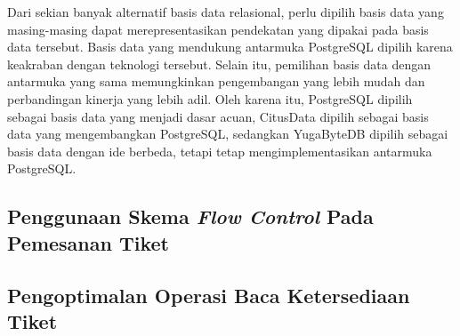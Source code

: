 Dari sekian banyak alternatif basis data relasional, perlu dipilih basis data yang masing-masing dapat merepresentasikan pendekatan yang dipakai pada basis data tersebut. Basis data yang mendukung antarmuka PostgreSQL dipilih karena keakraban dengan teknologi tersebut. Selain itu, pemilihan basis data dengan antarmuka yang sama memungkinkan pengembangan yang lebih mudah dan perbandingan kinerja yang lebih adil. Oleh karena itu, PostgreSQL dipilih sebagai basis data yang menjadi dasar acuan, CitusData dipilih sebagai basis data yang mengembangkan PostgreSQL, sedangkan YugaByteDB dipilih sebagai basis data dengan ide berbeda, tetapi tetap mengimplementasikan antarmuka PostgreSQL.

\subsection{Penggunaan Skema \textit{Flow Control} Pada Pemesanan Tiket}

\subsection{Pengoptimalan Operasi Baca Ketersediaan Tiket}
